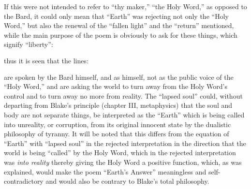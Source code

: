 If this were not intended to refer to \enquote{thy maker,} \enquote{the Holy Word,} as opposed to the Bard, it could
only mean that \enquote{Earth} was rejecting not only the \enquote{Holy Word,} but also the renewal of the \enquote{fallen light}
and the \enquote{return} mentioned, while the main purpose of the poem is obviously to ask for these things, which
signify \enquote{liberty}:


\noindent thus it is seen that the lines:


\noindent are spoken by the Bard himself, and as himself, not as the public voice
of the \enquote{Holy Word,} and are asking the world to turn away from the Holy Word's
control and to turn away no more from reality. The \enquote{lapsed soul} could, without departing
from Blake's principle (chapter III, metaphysics) that the soul and body are not separate
things, be interpreted as the \enquote{Earth} which is being called into unreality, or corruption, from
its original innocent state by the dualistic philosophy of tyranny. It will be noted that this
differs from the equation of \enquote{Earth} with \enquote{lapsed soul} in the rejected interpretation in the
direction that the world is being \enquote{called} by the Holy Word, which in the rejected interpretation
was \emph{into reality} thereby giving the Holy Word a positive function, which, as was explained,
would make the poem \enquote{Earth's Answer} meaningless and self-contradictory and would also be contrary
to Blake's total philosophy.

